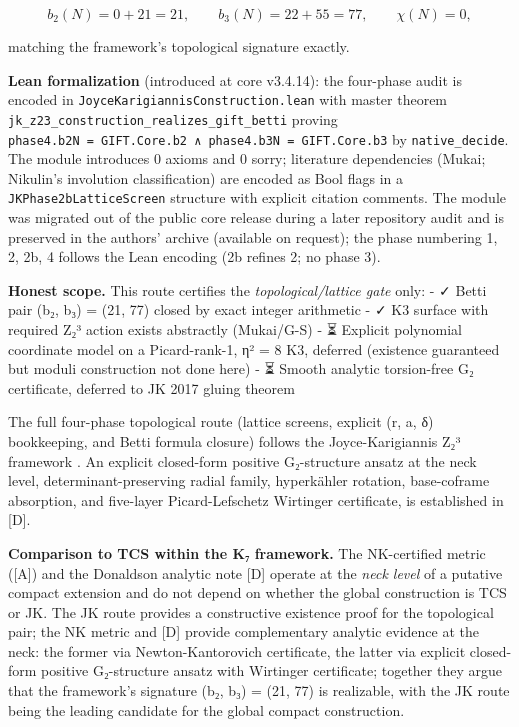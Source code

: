 \documentclass[11pt,a4paper]{article}
\begin{document}
\[b_2(N) = 0 + 21 = 21, \qquad b_3(N) = 22 + 55 = 77, \qquad \chi(N) = 0,\]

matching the framework's topological signature exactly.

\textbf{Lean formalization} (introduced at core v3.4.14): the four-phase audit is encoded in \texttt{Joyce\allowbreak{}Karigiannis\allowbreak{}Construction.\allowbreak{}lean} with master theorem \texttt{jk\_\allowbreak{}z23\_\allowbreak{}construction\_\allowbreak{}realizes\_\allowbreak{}gift\_\allowbreak{}betti} proving \texttt{phase4.\allowbreak{}b2N\ =\ GIFT.\allowbreak{}Core.\allowbreak{}b2\ ∧\ phase4.\allowbreak{}b3N\ =\ GIFT.\allowbreak{}Core.\allowbreak{}b3} by \texttt{native\_\allowbreak{}decide}. The module introduces 0 axioms and 0 sorry; literature dependencies (Mukai; Nikulin's involution classification) are encoded as Bool flags in a \texttt{JKPhase2b\allowbreak{}Lattice\allowbreak{}Screen} structure with explicit citation comments. The module was migrated out of the public core release during a later repository audit and is preserved in the authors' archive (available on request); the phase numbering 1, 2, 2b, 4 follows the Lean encoding (2b refines 2; no phase 3).

\textbf{Honest scope.} This route certifies the \emph{topological/lattice gate} only: - ✓ Betti pair (b₂, b₃) = (21, 77) closed by exact integer arithmetic - ✓ K3 surface with required Z₂³ action exists abstractly (Mukai/G-S) - ⏳ Explicit polynomial coordinate model on a Picard-rank-1, η² = 8 K3, deferred (existence guaranteed but moduli construction not done here) - ⏳ Smooth analytic torsion-free G₂ certificate, deferred to JK 2017 gluing theorem

The full four-phase topological route (lattice screens, explicit (r, a, δ) bookkeeping, and Betti formula closure) follows the Joyce-Karigiannis Z₂³ framework \cite{43}. An explicit closed-form positive G₂-structure ansatz at the neck level, determinant-preserving radial family, hyperkähler rotation, base-coframe absorption, and five-layer Picard-Lefschetz Wirtinger certificate, is established in {[}D{]}.

\textbf{Comparison to TCS within the K₇ framework.} The NK-certified metric ({[}A{]}) and the Donaldson analytic note {[}D{]} operate at the \emph{neck level} of a putative compact extension and do not depend on whether the global construction is TCS or JK. The JK route provides a constructive existence proof for the topological pair; the NK metric and {[}D{]} provide complementary analytic evidence at the neck: the former via Newton-Kantorovich certificate, the latter via explicit closed-form positive G₂-structure ansatz with Wirtinger certificate; together they argue that the framework's signature (b₂, b₃) = (21, 77) is realizable, with the JK route being the leading candidate for the global compact construction.
\end{document}
